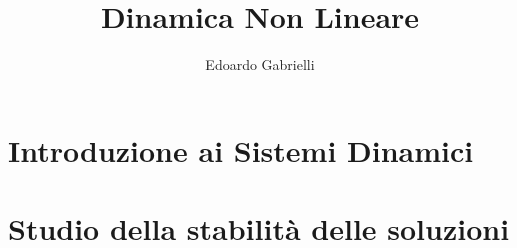 
\author{Edoardo Gabrielli}
\title{Dinamica Non Lineare}


\let\cleardoublepage\clearpage
\mygeo

\maketitle 
\tableofcontents

\restoregeometry

\chapter{Introduzione ai Sistemi Dinamici}










\chapter{Studio della stabilità delle soluzioni}













